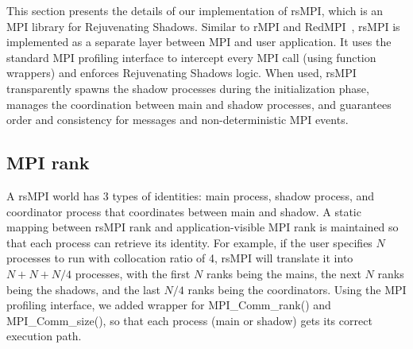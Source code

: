 This section presents the details of our implementation of rsMPI, which is an MPI library for Rejuvenating Shadows. 
Similar to rMPI and RedMPI~\cite{ferreira_sc_2011,fiala_2012_sdc}, rsMPI is implemented as a separate layer between MPI and user application. It uses the standard MPI profiling interface to intercept every MPI call (using function wrappers) and enforces Rejuvenating Shadows logic. 
When used, rsMPI transparently spawns the shadow processes during the initialization phase, manages the coordination between main and shadow processes, and guarantees order and consistency for messages and non-deterministic MPI events.

\subsection{MPI rank}
A rsMPI world has 3 types of identities: main process, shadow process, and coordinator process that coordinates between main and shadow. A static mapping between rsMPI rank and application-visible MPI rank is maintained so that each process can retrieve its identity. For example, if the user specifies $N$ processes to run with collocation ratio of 4, rsMPI will translate it into $N + N + N/4$ processes, %
with the first $N$ ranks being the mains, the next $N$ ranks being the shadows, and the last $N/4$ ranks being the coordinators. 
Using the MPI profiling interface, we added wrapper for MPI\_Comm\_rank() and MPI\_Comm\_size(), so that each process (main or shadow) gets its correct execution path.



